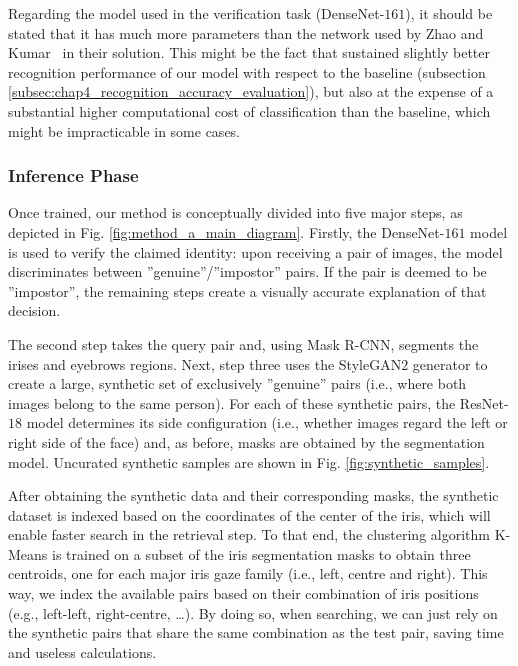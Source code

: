 Regarding the model used in the verification task (DenseNet-$161$), it should be stated that it has much more parameters than the network used by Zhao and Kumar~\cite{accurate_periocular_recognition} in their solution. This might be the fact that sustained slightly better recognition performance of our model with respect to the baseline (subsection \ref{subsec:chap4_recognition_accuracy_evaluation}), but also at the expense of a substantial higher computational cost of classification than the baseline, which might be impracticable in some cases.

\subsubsection{Inference Phase}
\label{subsec:chap3_method_a_inference_phase}

Once trained, our method is conceptually divided into five major steps, as depicted in Fig. \ref{fig:method_a_main_diagram}. Firstly, the DenseNet-$161$ model is used to verify the claimed identity: upon receiving a pair of images, the model discriminates  between ''genuine''/''impostor'' pairs. If the pair is deemed to be ''impostor'', the remaining steps create a visually accurate explanation of that decision.

The second step takes the query pair and, using Mask \ac{R-CNN}, segments the irises and eyebrows regions. Next, step three uses the Style\ac{GAN}$2$ generator to create a large, synthetic set of exclusively ''genuine'' pairs (i.e., where both images belong to the same person). For each of these synthetic pairs, the ResNet-$18$ model determines its side configuration (i.e., whether images regard the left or right side of the face) and, as before, masks are obtained by the segmentation model. Uncurated synthetic samples are shown in Fig. \ref{fig:synthetic_samples}.

After obtaining the synthetic data and their corresponding masks, the synthetic dataset is indexed based on the coordinates of the center of the iris, which will enable faster search in the retrieval step. To that end, the clustering algorithm K-Means is trained on a subset of the iris segmentation masks to obtain three centroids, one for each major iris gaze family (i.e., left, centre and right). This way, we index the available pairs based on their combination of iris positions (e.g., left-left, right-centre, \ldots). By doing so, when searching, we can just rely on the synthetic pairs that share the same combination as the test pair, saving time and useless calculations. 

